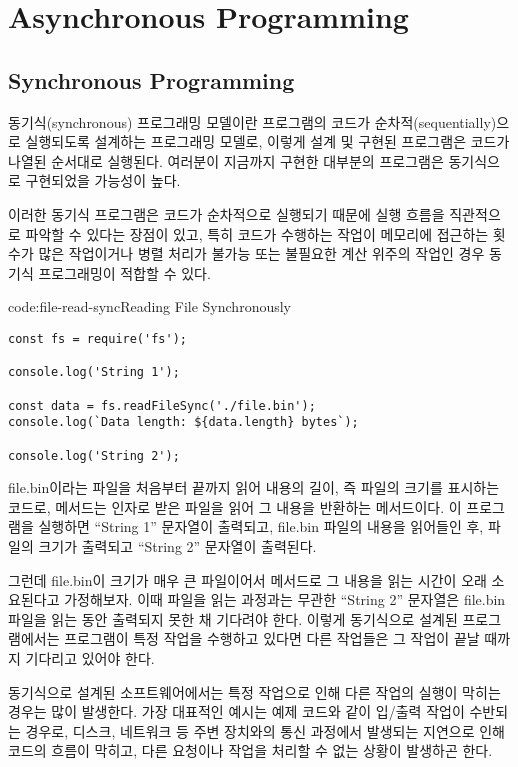 \section{Asynchronous Programming}\label{sect:asynchronous-programming}

\subsection*{Synchronous Programming}

동기식(synchronous) 프로그래밍 모델이란 프로그램의 코드가 순차적(sequentially)으로 실행되도록 설계하는 프로그래밍 모델로, 이렇게 설계 및 구현된 프로그램은 코드가 나열된 순서대로 실행된다. 여러분이 지금까지 구현한 대부분의 프로그램은 동기식으로 구현되었을 가능성이 높다.

이러한 동기식 프로그램은 코드가 순차적으로 실행되기 때문에 실행 흐름을 직관적으로 파악할 수 있다는 장점이 있고, 특히 코드가 수행하는 작업이 메모리에 접근하는 횟수가 많은 작업이거나 병렬 처리가 불가능 또는 불필요한 계산 위주의 작업인 경우 동기식 프로그래밍이 적합할 수 있다.

\begin{codeenv}{code:file-read-sync}{Reading File Synchronously}\begin{verbatim}
const fs = require('fs');

console.log('String 1');

const data = fs.readFileSync('./file.bin');
console.log(`Data length: ${data.length} bytes`);

console.log('String 2');
\end{verbatim}
\end{codeenv}

\는 file.bin이라는 파일을 처음부터 끝까지 읽어 내용의 길이, 즉 파일의 크기를 표시하는 코드로,  메서드는 인자로 받은 파일을 읽어 그 내용을 반환하는 메서드이다. 이 프로그램을 실행하면 ``String 1'' 문자열이 출력되고, file.bin 파일의 내용을 읽어들인 후, 파일의 크기가 출력되고 ``String 2'' 문자열이 출력된다.

그런데 file.bin이 크기가 매우 큰 파일이어서  메서드로 그 내용을 읽는 시간이 오래 소요된다고 가정해보자. 이때 파일을 읽는 과정과는 무관한 ``String 2'' 문자열은 file.bin 파일을 읽는 동안 출력되지 못한 채 기다려야 한다. 이렇게 동기식으로 설계된 프로그램에서는 프로그램이 특정 작업을 수행하고 있다면 다른 작업들은 그 작업이 끝날 때까지 기다리고 있어야 한다.

동기식으로 설계된 소프트웨어에서는 특정 작업으로 인해 다른 작업의 실행이 막히는 경우는 많이 발생한다. 가장 대표적인 예시는 예제 코드와 같이 입/출력 작업이 수반되는 경우로, 디스크, 네트워크 등 주변 장치와의 통신 과정에서 발생되는 지연으로 인해 코드의 흐름이 막히고, 다른 요청이나 작업을 처리할 수 없는 상황이 발생하곤 한다.

